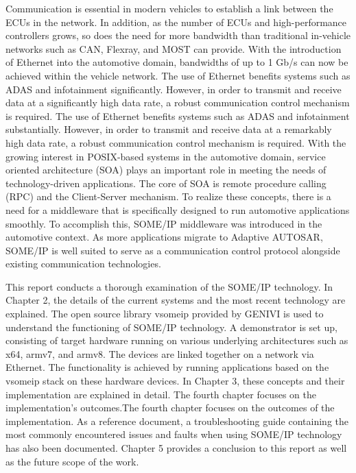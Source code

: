 
Communication is essential in modern vehicles to establish a link between the ECUs in the network. In addition, as the number of ECUs and high-performance controllers grows, so does the need for more bandwidth than traditional in-vehicle networks such as CAN, Flexray, and MOST can provide. With the introduction of Ethernet into the automotive domain, bandwidths of up to 1 Gb/s can now be achieved within the vehicle network. The use of Ethernet benefits systems such as ADAS and infotainment significantly. However, in order to transmit and receive data at a significantly high data rate, a robust communication control mechanism is required. The use of Ethernet benefits systems such as ADAS and infotainment substantially. However, in order to transmit and receive data at a remarkably high data rate, a robust communication control mechanism is required. With the growing interest in POSIX-based systems in the automotive domain, service oriented architecture (SOA) plays an important role in meeting the needs of technology-driven applications. The core of SOA is remote procedure calling (RPC) and the Client-Server mechanism. To realize these concepts, there is a need for a middleware that is specifically designed to run automotive applications smoothly. To accomplish this, SOME/IP middleware was introduced in the automotive context. As more applications migrate to Adaptive AUTOSAR, SOME/IP is well suited to serve as a communication control protocol alongside existing communication technologies.

This report conducts a thorough examination of the SOME/IP technology. In Chapter 2, the details of the current systems and the most recent technology are explained. The open source library vsomeip provided by GENIVI is used to understand the functioning of SOME/IP technology. A demonstrator is set up, consisting of target hardware running on various underlying architectures such as x64, armv7, and armv8. The devices are linked together on a network via Ethernet. The functionality is achieved by running applications based on the vsomeip stack on these hardware devices. In Chapter 3, these concepts and their implementation are explained in detail. The fourth chapter focuses on the implementation's outcomes.The fourth chapter focuses on the outcomes of the implementation. As a reference document, a troubleshooting guide containing the most commonly encountered issues and faults when using SOME/IP technology has also been documented. Chapter 5 provides a conclusion to this report as well as the future scope of the work.